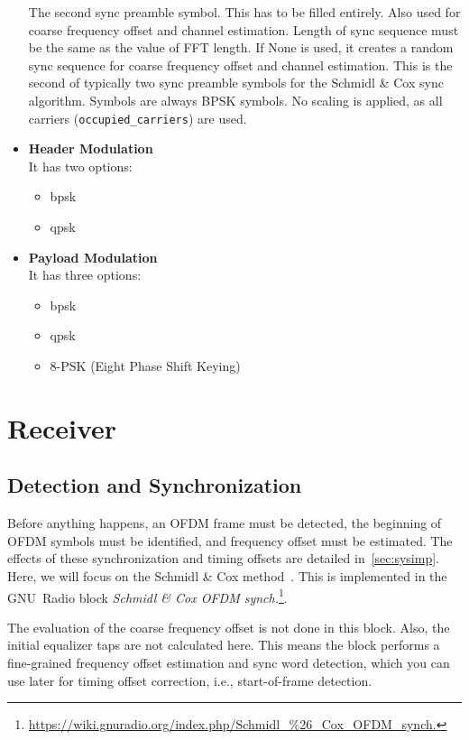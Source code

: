 \begin{itemize}
    The second sync preamble symbol. This has to be filled entirely. Also used for coarse frequency offset and channel estimation. Length of sync sequence must be the same as the value of FFT length.  
    If None is used, it creates a random sync sequence for coarse frequency offset and channel estimation. This is the second of typically two sync preamble symbols for the Schmidl \& Cox sync algorithm. Symbols are always BPSK symbols. No scaling is applied, as all carriers (\texttt{occupied_carriers}) are used.
    \item \textbf{Header Modulation}\\
     It has two options:
    \begin{itemize}
        \item \acrfull{bpsk}
        \item  \acrfull{qpsk}
    \end{itemize}
    \item \textbf{Payload Modulation}\\
    It has three options:
    \begin{itemize}
        \item \acrfull{bpsk}
        \item  \acrfull{qpsk}
        \item  8-PSK (Eight Phase Shift Keying)
    \end{itemize}
\end{itemize}




\section{Receiver}

\subsection{Detection and Synchronization}
Before anything happens, an OFDM frame must be detected, the beginning of OFDM symbols must be identified, and frequency offset must be estimated. The effects of these synchronization and timing offsets are detailed in~\cref{sec:sysimp}. Here, we will focus on the Schmidl \& Cox method~\cite{650240}. This is implemented in the GNU~Radio block \textit{Schmidl \& Cox OFDM synch.}\footnote{\url{https://wiki.gnuradio.org/index.php/Schmidl_\%26_Cox_OFDM_synch.}}.

The evaluation of the coarse frequency offset is not done in this block. Also, the initial equalizer taps are not calculated here. This means the block performs a fine-grained frequency offset estimation and sync word detection, which you can use later for timing offset correction, i.e., start-of-frame detection.

